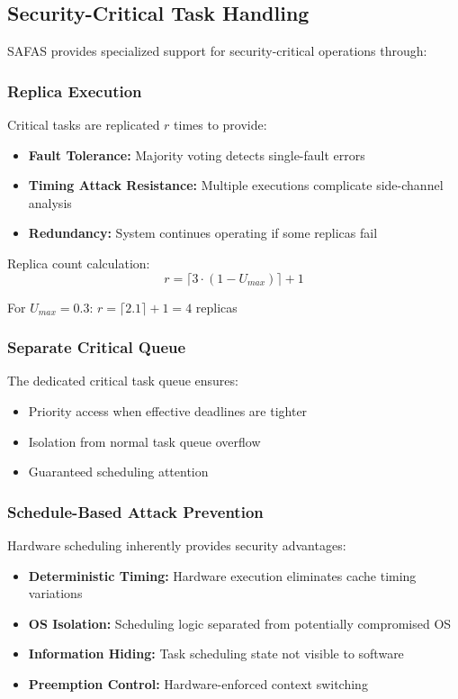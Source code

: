 \documentclass[12pt,a4paper]{article}
\begin{document}
\subsection{Security-Critical Task Handling}

SAFAS provides specialized support for security-critical operations through:

\subsubsection{Replica Execution}

Critical tasks are replicated $r$ times to provide:
\begin{itemize}
    \item \textbf{Fault Tolerance:} Majority voting detects single-fault errors
    \item \textbf{Timing Attack Resistance:} Multiple executions complicate side-channel analysis
    \item \textbf{Redundancy:} System continues operating if some replicas fail
\end{itemize}

Replica count calculation:
\begin{equation}
r = \lceil 3 \cdot (1 - U_{max}) \rceil + 1
\end{equation}

For $U_{max} = 0.3$: $r = \lceil 2.1 \rceil + 1 = 4$ replicas

\subsubsection{Separate Critical Queue}

The dedicated critical task queue ensures:
\begin{itemize}
    \item Priority access when effective deadlines are tighter
    \item Isolation from normal task queue overflow
    \item Guaranteed scheduling attention
\end{itemize}

\subsubsection{Schedule-Based Attack Prevention}

Hardware scheduling inherently provides security advantages:
\begin{itemize}
    \item \textbf{Deterministic Timing:} Hardware execution eliminates cache timing variations
    \item \textbf{OS Isolation:} Scheduling logic separated from potentially compromised OS
    \item \textbf{Information Hiding:} Task scheduling state not visible to software
    \item \textbf{Preemption Control:} Hardware-enforced context switching
\end{itemize}
\end{document}
